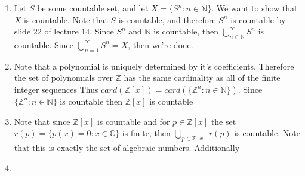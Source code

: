 \documentclass[12pt, letterpaper]{article}
\newcommand{\Z}{\mathbb{Z}}
\newcommand{\N}{\mathbb{N}}
\newcommand{\C}{\mathbb{C}}
\begin{document}
\begin{enumerate}
\begin{enumerate}
		\item Let $S$ be some countable set, and let $X = \{S^n : n \in \N\}$.  We want to show that $X$ is countable.  
		Note that $S$ is countable, and therefore $S^n$ is countable by slide 22 of lecture 14.  Since $S^n$ and $\N$ is countable, then $\bigcup_{n \in \N}^\infty S^n$ is countable.  Since $\bigcup_{n=1}^\infty S^n = X$, then we're done.  
		\item Note that a polynomial is uniquely determined by it's coefficients.
		Therefore the set of polynomials over $\Z$ has the same cardinality as all of the finite integer sequences  Thus $card(\Z[x]) = card(\{\Z^n: n \in \N\}).$  
		Since $\{\Z^n: n \in \N\}$ is countable then $\Z[x]$ is countable
		\item Note that since $\Z[x]$ is countable and for $p \in \Z[x]$ the set
		$r(p) = \{p(x) = 0 : x \in \C \}$ is finite, then $\bigcup_{p \in \Z[x]} r(p)$ is countable.  Note that this is exactly the set of algebraic numbers.  Additionally  \\ 
		\item 
	\end{enumerate}
\end{enumerate}
\end{document}
